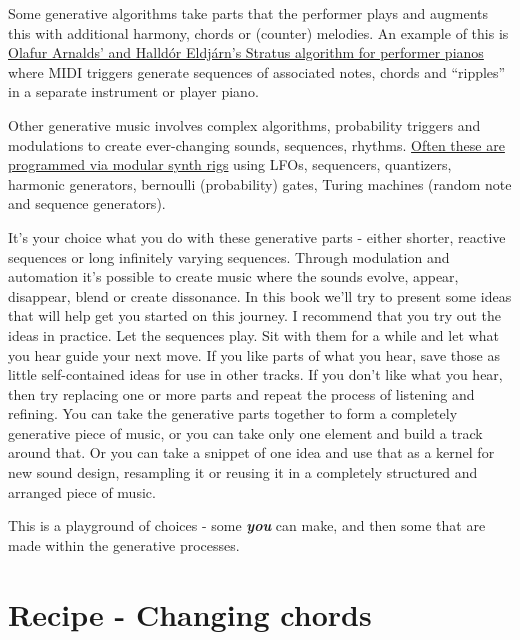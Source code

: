 \documentclass[
  12pt,
  letterpaper,
  oneside,
  open=any]{scrbook}
\begin{document}
Some generative algorithms take parts that the performer plays and
augments this with additional harmony, chords or (counter) melodies. An
example of this is
\href{https://www.youtube.com/watch?v=ktxkEBT5CB0}{Olafur Arnalds' and
Halldór Eldjárn's Stratus algorithm for performer pianos} where MIDI
triggers generate sequences of associated notes, chords and ``ripples''
in a separate instrument or player piano.

Other generative music involves complex algorithms, probability triggers
and modulations to create ever-changing sounds, sequences, rhythms.
\href{https://www.youtube.com/watch?v=uNz1XfVfJak}{Often these are
programmed via modular synth rigs} using LFOs, sequencers, quantizers,
harmonic generators, bernoulli (probability) gates, Turing machines
(random note and sequence generators).

It's your choice what you do with these generative parts - either
shorter, reactive sequences or long infinitely varying sequences.
Through modulation and automation it's possible to create music where
the sounds evolve, appear, disappear, blend or create dissonance. In
this book we'll try to present some ideas that will help get you started
on this journey. I recommend that you try out the ideas in practice. Let
the sequences play. Sit with them for a while and let what you hear
guide your next move. If you like parts of what you hear, save those as
little self-contained ideas for use in other tracks. If you don't like
what you hear, then try replacing one or more parts and repeat the
process of listening and refining. You can take the generative parts
together to form a completely generative piece of music, or you can take
only one element and build a track around that. Or you can take a
snippet of one idea and use that as a kernel for new sound design,
resampling it or reusing it in a completely structured and arranged
piece of music.

This is a playground of choices - some \textbf{\emph{you}} can make, and
then some that are made within the generative processes.


\chapter{Recipe - Changing
chords}\label{Chapter-001-Recipe-Changing_Chords}
\end{document}
